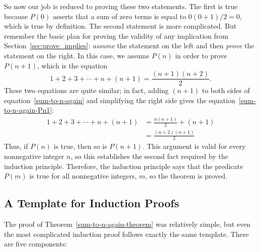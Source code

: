 So now our job is reduced to proving these two statements.  The first
is true because $P(0)$ asserts that a sum of zero terms is equal to
$0(0+1)/2 = 0$, which is true by definition.
%
The second statement is more complicated.  But remember the basic plan for
proving the validity of any implication from
Section~\ref{sec:prove_implies}: \emph{assume} the statement on 
the left and then \emph{prove} the statement on the right.  In this
case, we assume $P(n)$ in order to prove $P(n+1)$, which is the equation
\begin{equation}\label{sum-to-n-again-Pn1}
1 + 2 + 3 + \cdots + n + (n+1) = \frac{(n+1)(n+2)}{2}.
\end{equation}
These two equations are quite similar; in fact, adding $(n+1)$ to both
sides of equation~\eqref{sum-to-n-again} and simplifying the right side 
gives the equation~\eqref{sum-to-n-again-Pn1}:
\begin{align*}
1 + 2 + 3 + \cdots + n + (n+1)
    & = \frac{n(n+1)}{2} + (n+1) \\
    & = \frac{(n+2)(n+1)}{2}
\end{align*}
Thus, if $P(n)$ is true, then so is $P(n+1)$.  This argument is valid for
every nonnegative integer $n$, so this establishes the second fact
required by the induction principle.  Therefore, the induction principle
says that the predicate $P(m)$ is true for all nonnegative integers, $m$,
so the theorem is proved.

\subsection{A Template for Induction Proofs}
\label{templ-induct-proofs}

The proof of Theorem~\ref{sum-to-n-again-theorem} was relatively simple,
but even the most complicated induction proof follows exactly the same
template.  There are five components:

